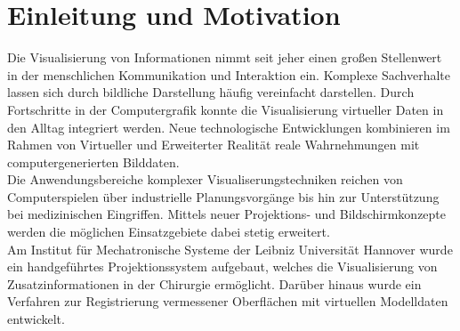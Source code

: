 \chapter{Einleitung und Motivation}


Die Visualisierung von Informationen nimmt seit jeher einen großen Stellenwert in der menschlichen Kommunikation und Interaktion ein. Komplexe Sachverhalte lassen sich durch bildliche Darstellung häufig vereinfacht darstellen. Durch Fortschritte in der Computergrafik konnte die Visualisierung virtueller Daten in den Alltag integriert werden. Neue technologische Entwicklungen kombinieren im Rahmen von Virtueller und Erweiterter Realität reale Wahrnehmungen mit computergenerierten Bilddaten.\\

Die Anwendungsbereiche komplexer Visualiserungstechniken reichen von Computerspielen über industrielle Planungsvorgänge bis hin zur Unterstützung bei medizinischen Eingriffen. Mittels neuer Projektions- und Bildschirmkonzepte werden die möglichen Einsatzgebiete dabei stetig erweitert.\\
Am Institut für Mechatronische Systeme der Leibniz Universität Hannover wurde ein handgeführtes Projektionssystem aufgebaut, welches die Visualisierung von Zusatzinformationen in der Chirurgie ermöglicht. Darüber hinaus wurde ein Verfahren zur Registrierung vermessener Oberflächen mit virtuellen Modelldaten entwickelt.\\


